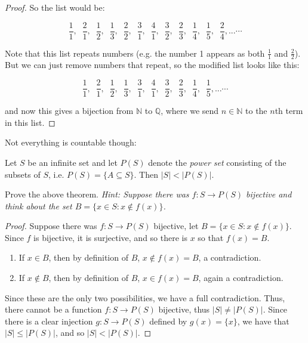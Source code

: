 \documentclass[11pt,dvipsnames]{book}
\numberwithin{figure}{section} %
\numberwithin{table}{section} %
\begin{document}
\begin{proof}
So the list would be:

\[
\frac{1}{1}, \;\; \frac{2}{1}, \;\; \frac{1}{2}, \;\; \frac{1}{3}, \;\; \frac{2}{2}, \;\; \frac{3}{1}, \;\; \frac{4}{1}, \;\; \frac{3}{2}, \;\; \frac{2}{3}, \;\; \frac{1}{4}, \;\; \frac{1}{5}, \;\; \frac{2}{4},...\cdots \]

Note that this list repeats numbers (e.g. the number 1 appears as both $\frac{1}{1}$ and $\frac{2}{2}$). But we can just remove numbers that repeat, so the modified list looks like this:

\[
\frac{1}{1}, \;\; \frac{2}{1}, \;\; \frac{1}{2}, \;\; \frac{1}{3},  \;\; \frac{3}{1}, \;\; \frac{4}{1}, \;\; \frac{3}{2}, \;\; \frac{2}{3}, \;\; \frac{1}{4}, \;\; \frac{1}{5},...\cdots \]

and now this gives a bijection from $\mathbb{N}$ to $\mathbb{Q}$, where we send $n\in\mathbb{N}$ to the $n$th term in this list.

\end{proof}

Not everything is countable though:

\begin{theorem}
Let $S$ be an infinite set and let $P(S)$ denote the {\it power set} consisting of the subsets of $S$, i.e. $P(S)= \{A\subseteq S\}$. Then $|S|<|P(S)|$.
\end{theorem}

\begin{exercise}
Prove the above theorem. {\it Hint: Suppose there was $f:S\rightarrow P(S)$ bijective and think about the set $B=\{x\in S: x\not\in f(x)\}$.}
\end{exercise}

\begin{solution}
\begin{proof}
Suppose there was $f:S\rightarrow P(S)$ bijective, let $B=\{x\in S: x\not\in f(x)\}$. Since $f$ is bijective, it is surjective, and so there is $x$ so that $f(x)=B$.
\begin{enumerate}
\item If $x\in B$, then by definition of $B$, $x\not\in f(x)=B$, a contradiction.
\item If $x\not\in B$, then by definition of $B$, $x\in f(x)=B$, again a contradiction.
\end{enumerate}
Since these are the only two possibilities, we have a full contradiction. Thus, there cannot be a function $f:S\rightarrow P(S)$ bijective, thus $|S|\neq |P(S)|$. Since there is a clear injection $g:S\rightarrow P(S)$ defined by $g(x)=\{x\}$, we have that $|S|\leq |P(S)|$, and so $|S|<|P(S)|$.
\end{proof}
\end{solution}
\end{document}
